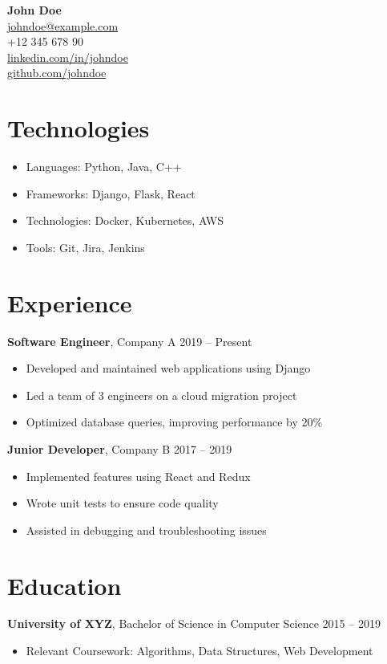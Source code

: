 \documentclass[10pt, letterpaper]{article}
\makeatletter
\newcommand{\header}{
    \begin{center}
        \textbf{\Huge John Doe} \\
        \vspace{10pt}
        \href{mailto:johndoe@example.com}{johndoe@example.com} \\
        +12 345 678 90 \\
        \href{https://linkedin.com/in/johndoe}{linkedin.com/in/johndoe} \\
        \href{https://github.com/johndoe}{github.com/johndoe}
    \end{center}
}
\newenvironment{highlights}{
    \begin{itemize}[topsep=0.10cm, parsep=0.10cm, partopsep=0pt, itemsep=0.5pt, leftmargin=0cm]
}{
    \end{itemize}
}
\makeatother
\begin{document}
\header

\section*{Technologies}
\begin{highlights}
    \item Languages: Python, Java, C++
    \item Frameworks: Django, Flask, React
    \item Technologies: Docker, Kubernetes, AWS
    \item Tools: Git, Jira, Jenkins
\end{highlights}

\section*{Experience}
\textbf{Software Engineer}, Company A \hfill 2019 -- Present
\begin{highlights}
    \item Developed and maintained web applications using Django
    \item Led a team of 3 engineers on a cloud migration project
    \item Optimized database queries, improving performance by 20\%
\end{highlights}

\textbf{Junior Developer}, Company B \hfill 2017 -- 2019
\begin{highlights}
    \item Implemented features using React and Redux
    \item Wrote unit tests to ensure code quality
    \item Assisted in debugging and troubleshooting issues
\end{highlights}

\section*{Education}
\textbf{University of XYZ}, Bachelor of Science in Computer Science \hfill 2015 -- 2019
\begin{highlights}
    \item Relevant Coursework: Algorithms, Data Structures, Web Development
\end{highlights}
\end{document}
